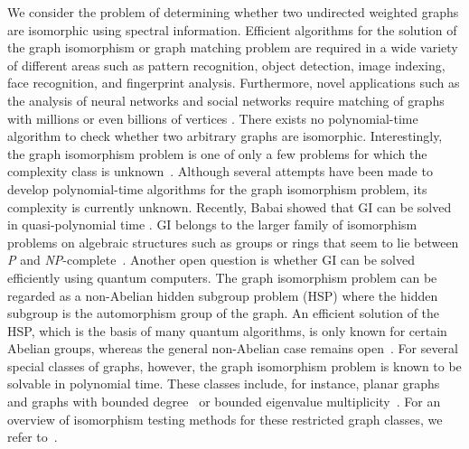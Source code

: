 \documentclass
[
    a4paper,
    DIV=11,
    abstracton
]
{scrartcl}
\theoremstyle{definition}
\begin{document}
We consider the problem of determining whether two undirected weighted graphs are isomorphic using spectral information. Efficient algorithms for the solution of the graph isomorphism or graph matching problem are required in a wide variety of different areas such as pattern recognition, object detection, image indexing, face recognition, and fingerprint analysis. Furthermore, novel applications such as the analysis of neural networks and social networks require matching of graphs with millions or even billions of vertices \cite{ABK15}. There exists no polynomial-time algorithm to check whether two arbitrary graphs are isomorphic. Interestingly, the graph isomorphism problem is one of only a few problems for which the complexity class is unknown~\cite{Koe06}. Although several attempts have been made to develop polynomial-time algorithms for the graph isomorphism problem, its complexity is currently unknown. Recently, Babai showed that GI can be solved in quasi-polynomial time \cite{Bab15}. GI belongs to the larger family of isomorphism problems on algebraic structures such as groups or rings that seem to lie between \textsl{P} and \textsl{NP}-complete~\cite{VT05}. Another open question is whether GI can be solved efficiently using quantum computers. The graph isomorphism problem can be regarded as a non-Abelian hidden subgroup problem (HSP) where the hidden subgroup is the automorphism group of the graph. An efficient solution of the HSP, which is the basis of many quantum algorithms, is only known for certain Abelian groups, whereas the general non-Abelian case remains open~\cite{HRT03}. For several special classes of graphs, however, the graph isomorphism problem is known to be solvable in polynomial time. These classes include, for instance, planar graphs~\cite{HT72} and graphs with bounded degree~\cite{Luk82} or bounded eigenvalue multiplicity~\cite{BGM82}. For an overview of isomorphism testing methods for these restricted graph classes, we refer to~\cite{Koe06}.
\end{document}

